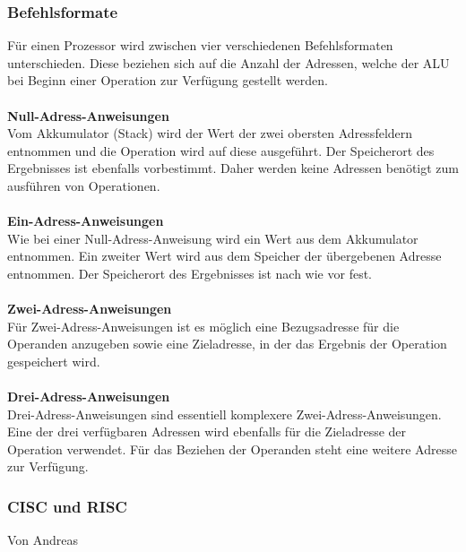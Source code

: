 \documentclass[12pt]{article}
\begin{document}
\subsubsection{Befehlsformate}
Für einen Prozessor wird zwischen vier verschiedenen Befehlsformaten unterschieden. Diese beziehen sich auf die Anzahl der Adressen, welche der ALU bei Beginn einer Operation zur Verfügung gestellt werden.\\ \\
\textbf{Null-Adress-Anweisungen}\\
Vom Akkumulator (Stack) wird der Wert der zwei obersten Adressfeldern entnommen und die Operation wird auf diese ausgeführt. Der Speicherort des Ergebnisses ist ebenfalls vorbestimmt. Daher werden keine Adressen benötigt zum ausführen von Operationen.\\ \\
\textbf{Ein-Adress-Anweisungen}\\
Wie bei einer Null-Adress-Anweisung wird ein Wert aus dem Akkumulator entnommen. Ein zweiter Wert wird aus dem Speicher der übergebenen Adresse entnommen. Der Speicherort des Ergebnisses ist nach wie vor fest.\\ \\
\textbf{Zwei-Adress-Anweisungen}\\
Für Zwei-Adress-Anweisungen ist es möglich eine Bezugsadresse für die Operanden anzugeben sowie eine Zieladresse, in der das Ergebnis der Operation gespeichert wird.\\ \\
\textbf{Drei-Adress-Anweisungen}\\
Drei-Adress-Anweisungen sind essentiell komplexere Zwei-Adress-Anweisungen. Eine der drei verfügbaren Adressen wird ebenfalls für die Zieladresse der Operation verwendet. Für das Beziehen der Operanden steht eine weitere Adresse zur Verfügung.\\

\subsubsection{CISC und RISC}
Von Andreas\\
\end{document}
